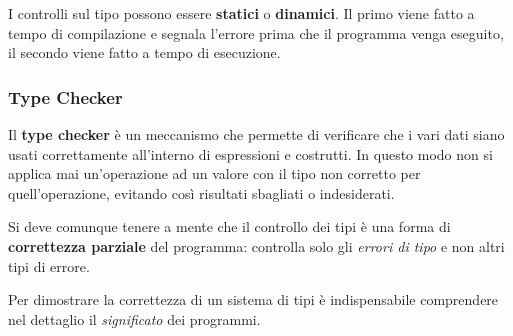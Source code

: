 I controlli sul tipo possono essere \textbf{statici} o \textbf{dinamici}. Il primo viene fatto a tempo di compilazione e
segnala l'errore prima che il programma venga eseguito, il secondo viene fatto a tempo di esecuzione.

\subsubsection{Type Checker}
Il \textbf{type checker} è un meccanismo che permette di verificare che i vari dati siano usati correttamente all'interno di
espressioni e costrutti. In questo modo non si applica mai un'operazione ad un valore con il tipo non corretto per
quell'operazione, evitando così risultati sbagliati o indesiderati.

Si deve comunque tenere a mente che il controllo dei tipi è una forma di \textbf{correttezza parziale} del programma:
controlla solo gli \emph{errori di tipo} e non altri tipi di errore.

Per dimostrare la correttezza di un sistema di tipi è indispensabile comprendere nel dettaglio il \emph{significato} dei
programmi.